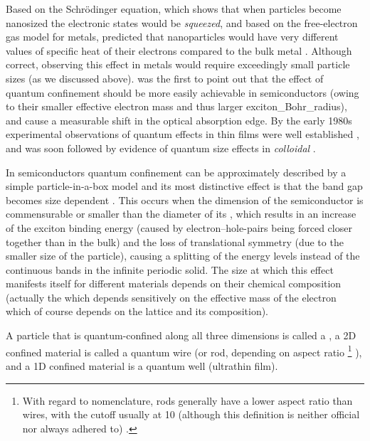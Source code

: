 \documentclass[webedition,openright,titles,swedish,english]{LuaUUThesis}\usepackage[]{graphicx}\usepackage[]{xcolor}
\begin{document}
Based on the Schrödinger equation, which shows that when particles become nanosized
the electronic states would be \emph{squeezed}, and based on the free-electron gas model
for metals, \textcite{Frohlich1937} predicted that nanoparticles would have very
different values of specific heat of their electrons compared to the bulk metal \cite{Linke2023}.
Although correct, observing this effect in metals would require exceedingly small
particle sizes (as we discussed above).
\textcite{Sandomirskii1963} was the first to point out that the effect of
quantum confinement should be more easily achievable in semiconductors (owing
to their smaller effective electron mass and thus larger \gls{exciton_Bohr_radius}),
and cause a measurable shift in the optical absorption edge.
By the early 1980s experimental observations of quantum effects in thin films
were well established \cite{Linke2023}, and was soon followed by evidence of
quantum size effects in \emph{colloidal}  \cite{Brus1984a}.

In semiconductors quantum confinement can be approximately described by
a simple particle-in-a-box model and its most distinctive effect is that
the band gap becomes size dependent \cite{Law2004}.
This occurs when the dimension of the semiconductor is commensurable
or smaller than the diameter of its , which results
in an increase of the exciton binding energy (caused by electron--hole-pairs
being forced closer together than in the bulk) \cite{Jimenez2016}
and the loss of translational symmetry (due to the smaller size of the particle),
causing a splitting of the energy levels instead of the continuous bands
in the infinite periodic solid.
The size at which this effect manifests itself for different materials depends
on their chemical composition
(actually the  which depends sensitively on
the effective mass of the electron which of course depends on the lattice
and its composition).

A particle that is quantum-confined along all three dimensions is called
a , a 2D confined material is called a quantum wire
(or rod, depending on aspect ratio%
\footnote{%
   With regard to nomenclature, rods generally have a lower aspect ratio
   than wires, with the cutoff usually at \num{10} (although this definition
   is neither official nor always adhered to) \cite{Jeevanandam2018}.}%
), and a 1D confined material is a quantum well (ultrathin film).
\end{document}
